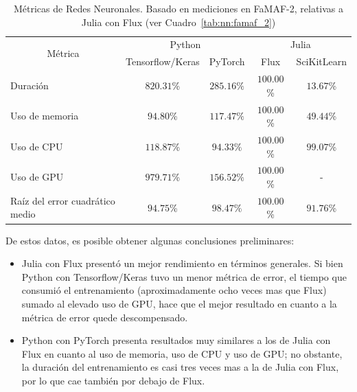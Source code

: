 \documentclass[11pt]{article}
\begin{document}
\begin{table}[H]
\centering
\begin{tabular}{|l|cc|cc|}
\hline
\multicolumn{1}{|c|}{\multirow{2}{*}{Métrica}} & \multicolumn{2}{c|}{Python} & \multicolumn{2}{c|}{Julia} \\ \cline{2-5} 
\multicolumn{1}{|c|}{} & \multicolumn{1}{c|}{Tensorflow/Keras} & PyTorch & \multicolumn{1}{c|}{Flux} & SciKitLearn \\ \hline
Duración & \multicolumn{1}{c|}{$820.31$\%} & $285.16\%$& \multicolumn{1}{c|}{$100.00$\%} & \multicolumn{1}{c|}{$13.67$\%} \\ \hline
Uso de memoria & \multicolumn{1}{c|}{$94.80$\%} & $117.47\%$& \multicolumn{1}{c|}{$100.00$\%} & \multicolumn{1}{c|}{$49.44$\%} \\ \hline
Uso de CPU & \multicolumn{1}{c|}{$118.87$\%} & $94.33\%$& \multicolumn{1}{c|}{$100.00$\%} & \multicolumn{1}{c|}{$99.07$\%} \\ \hline
Uso de GPU & \multicolumn{1}{c|}{$979.71$\%} & $156.52\%$& \multicolumn{1}{c|}{$100.00$\%} & - \\ \hline
Raíz del error cuadrático medio & \multicolumn{1}{c|}{$94.75$\%} & $98.47\%$& \multicolumn{1}{c|}{$100.00$\%} & \multicolumn{1}{c|}{$91.76$\%} \\ \hline
\end{tabular}
\caption{Métricas de Redes Neuronales. Basado en mediciones en FaMAF-2, relativas a Julia con Flux (ver Cuadro~\ref{tab:nn:famaf_2})}
\label{tab:nn:metrics}
\end{table}

De estos datos, es posible obtener algunas conclusiones preliminares:

\begin{itemize}
    \item Julia con Flux presentó un mejor rendimiento en términos generales. Si bien Python con Tensorflow/Keras tuvo un menor métrica de error, el tiempo que consumió el entrenamiento (aproximadamente ocho veces mas que Flux) sumado al elevado uso de GPU, hace que el mejor resultado en cuanto a la métrica de error quede descompensado.
    \item Python con PyTorch presenta resultados muy similares a los de Julia con Flux en cuanto al uso de memoria, uso de CPU y uso de GPU; no obstante, la duración del entrenamiento es casi tres veces mas a la de Julia con Flux, por lo que cae también por debajo de Flux.
\end{itemize}
\end{document}
